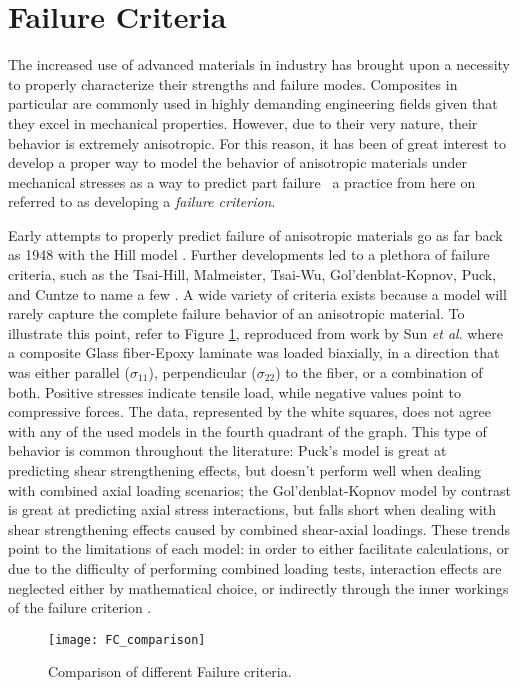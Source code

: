 \documentclass[main.tex]{subfiles}
\begin{document}
\section{Failure Criteria}\label{sec:FC}   
The increased use of advanced materials in industry has brought upon a necessity to properly characterize their strengths and failure modes. Composites in particular are commonly used in highly demanding engineering fields given that they excel in mechanical properties. However, due to their very nature, their behavior is extremely anisotropic. For this reason, it has been of great interest to develop a proper way to model the behavior of anisotropic materials under mechanical stresses as a way to predict part failure \textendash~a practice from here on referred to as developing a \emph{failure criterion}. 

Early attempts to properly predict failure of anisotropic materials go as far back as 1948 with the Hill model \cite{Osswald2017a}. Further developments led to a plethora of failure criteria, such as the Tsai-Hill, Malmeister, Tsai-Wu, Gol'denblat-Kopnov, Puck, and Cuntze to name a few \cite{Osswald2017a,Osswald2015}. A wide variety of criteria exists because a model will rarely capture the complete failure behavior of an anisotropic material. To illustrate this point, refer to Figure \ref{fig:FCComp}, reproduced from work by Sun \emph{et al}. \cite{Sun1996} where a composite Glass fiber-Epoxy laminate was loaded biaxially, in a direction that was either parallel ($\sigma_{11}$), perpendicular ($\sigma_{22}$) to the fiber, or a combination of both. Positive stresses indicate tensile load, while negative values point to compressive forces. The data, represented by the white squares, does not agree with any of the used models in the fourth quadrant of the graph. This type of behavior is common throughout the literature: Puck's model is great at predicting shear strengthening effects, but doesn't perform well when dealing with combined axial loading scenarios; the Gol'denblat-Kopnov model by contrast is great at predicting axial stress interactions, but falls short when dealing with shear strengthening effects caused by combined shear-axial loadings. These trends point to the limitations of each model: in order to either facilitate calculations, or due to the difficulty of performing combined loading tests, interaction effects are neglected either by mathematical choice, or indirectly through the inner workings of the failure criterion \cite{Osswald2017a}.  

\begin{figure}[h]
	\center
	\texttt{[image: FC\_comparison]}
	\caption{Comparison of different Failure criteria. \cite{Sun1996}} \label{fig:FCComp}
\end{figure}     
\end{document}
